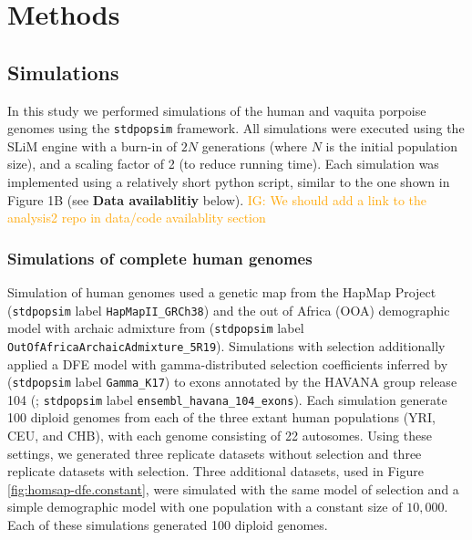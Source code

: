 \documentclass[hidelinks]{article}
\newcommand{\stdpopsim}{\texttt{stdpopsim}\xspace}
\newcommand{\igcomment}[1]{\textcolor{orange}{IG: #1}}
\begin{document}
\section*{Methods}
    \label{methods}

    \subsection*{Simulations}
    In this study we performed simulations of the human and vaquita porpoise genomes
    using the \stdpopsim{} framework.
    All simulations were executed using the SLiM engine with a burn-in of $2N$ generations
    (where $N$ is the initial population size), and a scaling factor of 2 (to reduce running time).
    Each simulation was implemented using a relatively short python script, similar to the one shown in Figure 1B
    (see \textbf{Data availablitiy} below).
    \igcomment{We should add a link to the analysis2 repo in data/code availablity section}
   
    \subsubsection*{Simulations of complete human genomes}
    Simulation of human genomes used a genetic map from the HapMap Project
    \citep{international2007second} (\stdpopsim label \texttt{HapMapII\_GRCh38}) and
    the out of Africa (OOA) demographic model with archaic admixture from
    \cite{ragsdale2019models} (\stdpopsim label \texttt{OutOfAfricaArchaicAdmixture\_5R19}).
    Simulations with selection additionally applied a DFE model with gamma-distributed selection coefficients inferred by
    \cite{kim2017inference} (\stdpopsim label \texttt{Gamma\_K17}) to exons annotated by the HAVANA group release 104
    (\cite{ensembl2018}; \stdpopsim label \texttt{ensembl\_havana\_104\_exons}).
    Each simulation generate 100 diploid genomes from each of the three extant human populations (YRI, CEU, and CHB),
    with each genome consisting of 22 autosomes.
    Using these settings, we generated three replicate datasets without selection
    and three replicate datasets with selection.
    Three additional datasets, used in Figure \ref{fig:homsap-dfe.constant},
    were simulated with the same model of selection and a simple demographic model with one population with a constant size of $10,000$.
    Each of these simulations generated 100 diploid genomes.
    
\end{document}
